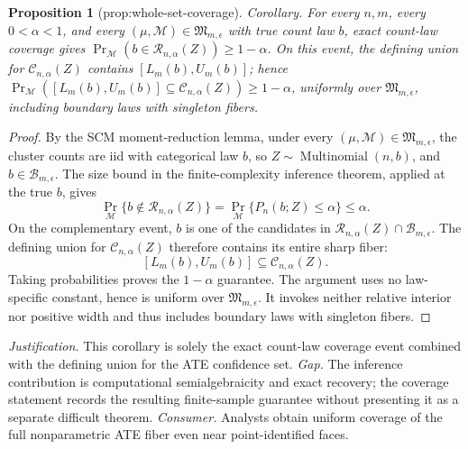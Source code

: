 \documentclass{article}
\newtheorem{proposition}{Proposition}
\begin{document}
\begin{proposition}[prop:whole-set-coverage]\label{prop:whole-set-coverage}
Corollary. For every \(n,m\), every \(0<\alpha<1\), and every \((\mu,\mathcal M)\in\mathfrak M_{m,\epsilon}\) with true count law \(b\), exact count-law coverage gives \(\Pr_{\mathcal M}(b\in\mathcal R_{n,\alpha}(Z))\ge1-\alpha\). On this event, the defining union for \(\mathcal C_{n,\alpha}(Z)\) contains \([L_m(b),U_m(b)]\); hence \(\Pr_{\mathcal M}([L_m(b),U_m(b)]\subseteq\mathcal C_{n,\alpha}(Z))\ge1-\alpha\), uniformly over \(\mathfrak M_{m,\epsilon}\), including boundary laws with singleton fibers.
\end{proposition}
\begin{proof}
By the SCM moment-reduction lemma, under every \((\mu,\mathcal M)\in\mathfrak M_{m,\epsilon}\), the cluster counts are iid with categorical law \(b\), so \(Z\sim\operatorname{Multinomial}(n,b)\), and \(b\in\mathcal B_{m,\epsilon}\).  The size bound in the finite-complexity inference theorem, applied at the true \(b\), gives
\[
 \Pr_{\mathcal M}\{b\notin\mathcal R_{n,\alpha}(Z)\}
 =\Pr_{\mathcal M}\{P_n(b;Z)\leq\alpha\}\leq\alpha.
\]
On the complementary event, \(b\) is one of the candidates in \(\mathcal R_{n,\alpha}(Z)\cap\mathcal B_{m,\epsilon}\).  The defining union for \(\mathcal C_{n,\alpha}(Z)\) therefore contains its entire sharp fiber:
\[
 [L_m(b),U_m(b)]\subseteq\mathcal C_{n,\alpha}(Z).
\]
Taking probabilities proves the \(1-\alpha\) guarantee.  The argument uses no law-specific constant, hence is uniform over \(\mathfrak M_{m,\epsilon}\).  It invokes neither relative interior nor positive width and thus includes boundary laws with singleton fibers.
\end{proof}
\par\smallskip\noindent \textit{Justification.} This corollary is solely the exact count-law coverage event combined with the defining union for the ATE confidence set. \textit{Gap.} The inference contribution is computational semialgebraicity and exact recovery; the coverage statement records the resulting finite-sample guarantee without presenting it as a separate difficult theorem. \textit{Consumer.} Analysts obtain uniform coverage of the full nonparametric ATE fiber even near point-identified faces.
\end{document}

